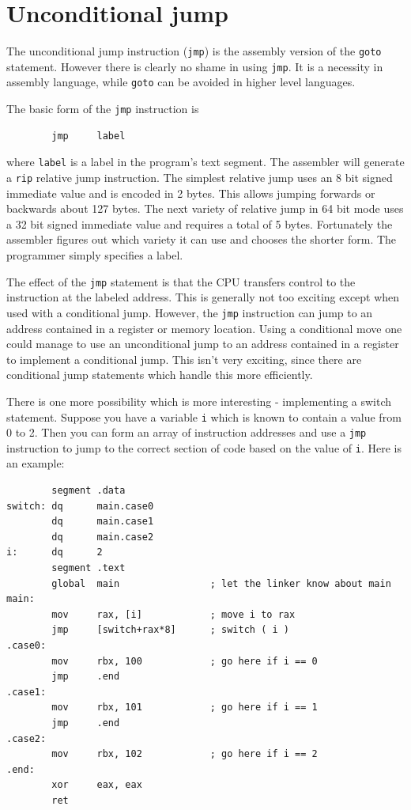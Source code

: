 \documentclass[11pt,b5paper]{book}
\begin{document}
\section{Unconditional jump}

The unconditional jump instruction ({\tt jmp}) is the assembly version of the {\tt goto} statement. 
However there is clearly no shame in using {\tt jmp}.
It is a necessity in assembly language, while {\tt goto} can be avoided in higher level languages.

The basic form of the {\tt jmp} instruction is 
\begin{verbatim}
        jmp     label
\end{verbatim}
where {\tt label} is a label in the program's text segment.
The assembler will generate a {\tt rip} relative jump instruction. 
The simplest relative jump uses an 8 bit signed immediate value and is encoded in 2 bytes.
This allows jumping forwards or backwards about 127 bytes.
The next variety of relative jump in 64 bit mode uses a 32 bit signed immediate value and requires a total of 5 bytes.
Fortunately the assembler figures out which variety it can use and chooses the shorter form.
The programmer simply specifies a label.

The effect of the {\tt jmp} statement is that the CPU transfers control to the instruction at the labeled address.
This is generally not too exciting except when used with a conditional jump.
However, the {\tt jmp} instruction can jump to an address contained in a register or memory location.
Using a conditional move one could manage to use an unconditional jump to an address contained in a register to
implement a conditional jump.
This isn't very exciting, since there are conditional jump statements which handle this more efficiently.

There is one more possibility which is more interesting - implementing a switch statement.
Suppose you have a variable {\tt i} which is known to contain a value from 0 to 2.
Then you can form an array of instruction addresses and use a {\tt jmp} instruction to jump to the correct section
of code based on the value of {\tt i}.
Here is an example:
\begin{verbatim}
        segment .data
switch: dq      main.case0
        dq      main.case1
        dq      main.case2
i:      dq      2
        segment .text
        global  main                ; let the linker know about main
main:
        mov     rax, [i]            ; move i to rax
        jmp     [switch+rax*8]      ; switch ( i )
.case0:
        mov     rbx, 100            ; go here if i == 0
        jmp     .end
.case1:
        mov     rbx, 101            ; go here if i == 1
        jmp     .end     
.case2:
        mov     rbx, 102            ; go here if i == 2
.end:
        xor     eax, eax
        ret
\end{verbatim}
\end{document}
